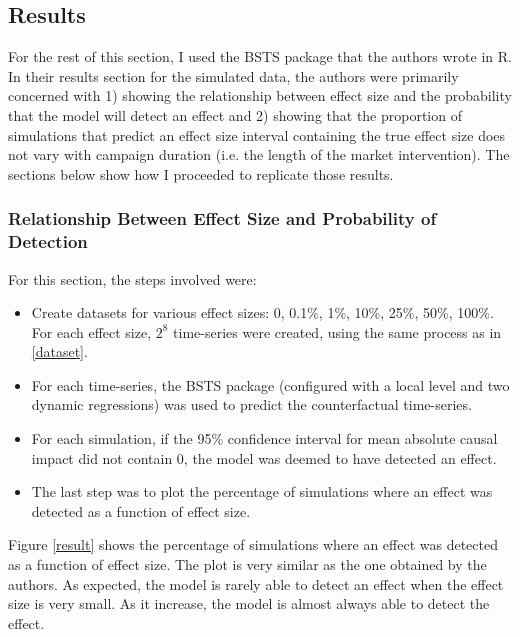 \documentclass[12pt]{article}
\begin{document}
\subsection{Results}
For the rest of this section, I used the BSTS package that the authors wrote in R. In their results section for the simulated data, the authors were primarily concerned with 1) showing the relationship between effect size and the probability that the model will detect an effect and 2) showing that the proportion of simulations that predict an effect size interval containing the true effect size does not vary with campaign duration (i.e. the length of the market intervention). The sections below show how I proceeded to replicate those results.

\subsubsection{Relationship Between Effect Size and Probability of Detection}
For this section, the steps involved were:
\begin{itemize}
    \item Create datasets for various effect sizes: 0, 0.1\%, 1\%, 10\%, 25\%, 50\%, 100\%. For each effect size, $2^8$ time-series were created, using the same process as in \ref{dataset}.
    \item For each time-series, the BSTS package (configured with a local level and two dynamic regressions) was used to predict the counterfactual time-series.
    \item For each simulation, if the 95\% confidence interval for mean absolute causal impact did not contain 0, the model was deemed to have detected an effect.
    \item The last step was to plot the percentage of simulations where an effect was detected as a function of effect size.
\end{itemize}



Figure \ref{result} shows the percentage of simulations where an effect was detected as a function of effect size. The plot is very similar as the one obtained by the authors. As expected, the model is rarely able to detect an effect when the effect size is very small. As it increase, the model is almost always able to detect the effect. 
\end{document}
